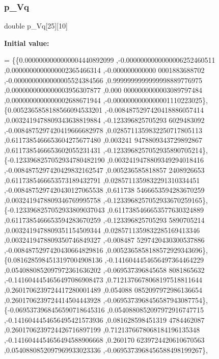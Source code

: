 \mbox{\label{a00452_abf10b982df024e8903cffbedbcdfe264}} 
\subsubsection{\texorpdfstring{p\+\_\+\+Vq}{p\_Vq}}
{\footnotesize\ttfamily double p\+\_\+\+Vq\mbox{[}25\mbox{]}\mbox{[}10\mbox{]}}

{\bfseries Initial value\+:}
\begin{DoxyCode}
= \{\{0.0000000000000004440892099 ,-0.0000000000000006252460511 ,0.0000000000000002365466314 ,-0.000000000000
      0001883688702 ,-0.0000000000000005524384566 ,0.9999999999999998889776975 ,0.0000000000000003956307877 ,0.000
      0000000000003089797484 ,0.0000000000000002688671944 ,-0.0000000000000001110223025\},
\{0.0052365858188566094533201 ,-0.0084875297420418886057414 ,0.0032419478809343638819884 ,-0.123396825705293
      6029483092 ,-0.0084875297420419666682978 ,0.0285711359832250717805113 ,0.6117385466653604275677480 ,0.003241
      9478809343729892867 ,0.6117385466653602055231431 ,-0.1233968257052935890705214\},
\{-0.1233968257052934780482190 ,0.0032419478809349294018416 ,-0.0084875297420429832162547 ,0.005236585818857
      2408926653 ,0.6117385466653573189432791 ,0.0285711359832291310334451 ,-0.0084875297420430127065538 ,0.611738
      5466653594283670259 ,0.0032419478809346769995758 ,-0.1233968257052933670259165\},
\{-0.1233968257052933809037043 ,0.6117385466653577630324889 ,0.6117385466653594283670259 ,-0.123396825705293
      5890705214 ,0.0032419478809351154509344 ,0.0285711359832285169413346 ,0.0032419478809350746849327 ,-0.008487
      5297420430300537886 ,-0.0084875297420430664829816 ,0.0052365858188572929343696\},
\{0.0816285984513197004908136 ,-0.1416044454656497364464229 ,0.0540880852097972361636202 ,-0.069537396845658
      8081865632 ,-0.1416044454656497086908473 ,0.7121376678068197518811644 ,0.2601706239724417280001489 ,0.054088
      0852097972986136654 ,0.2601706239724414504443928 ,-0.0695373968456587943087754\},
\{-0.0695373968456590718645316 ,0.0540880852097972916747715 ,-0.1416044454656495421573936 ,0.081628598451319
      4784462087 ,0.2601706239724426716897199 ,0.7121376678068184196135348 ,-0.1416044454656494588906668 ,0.260170
      6239724420610670563 ,0.0540880852097969933023336 ,-0.0695373968456588498199267\},

\end{DoxyCode}
